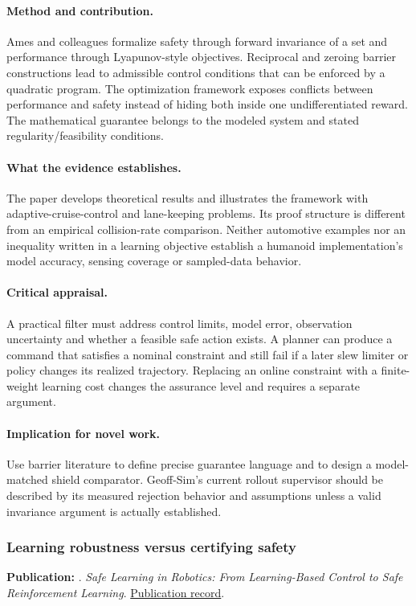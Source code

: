 \paragraph{Method and contribution.} Ames and colleagues formalize safety through forward invariance of a set and performance through Lyapunov-style objectives. Reciprocal and zeroing barrier constructions lead to admissible control conditions that can be enforced by a quadratic program. The optimization framework exposes conflicts between performance and safety instead of hiding both inside one undifferentiated reward. The mathematical guarantee belongs to the modeled system and stated regularity/feasibility conditions.

\paragraph{What the evidence establishes.} The paper develops theoretical results and illustrates the framework with adaptive-cruise-control and lane-keeping problems. Its proof structure is different from an empirical collision-rate comparison. Neither automotive examples nor an inequality written in a learning objective establish a humanoid implementation's model accuracy, sensing coverage or sampled-data behavior.

\paragraph{Critical appraisal.} A practical filter must address control limits, model error, observation uncertainty and whether a feasible safe action exists. A planner can produce a command that satisfies a nominal constraint and still fail if a later slew limiter or policy changes its realized trajectory. Replacing an online constraint with a finite-weight learning cost changes the assurance level and requires a separate argument.

\paragraph{Implication for novel work.} Use barrier literature to define precise guarantee language and to design a model-matched shield comparator. Geoff-Sim's current rollout supervisor should be described by its measured rejection behavior and assumptions unless a valid invariance argument is actually established.

\subsubsection{Learning robustness versus certifying safety}\label{paper:safecontrol}
\textbf{Publication:} \citet{safecontrol}. \emph{Safe Learning in Robotics: From Learning-Based Control to Safe Reinforcement Learning}. \href{https://doi.org/10.1146/annurev-control-042920-020211}{Publication record}.

